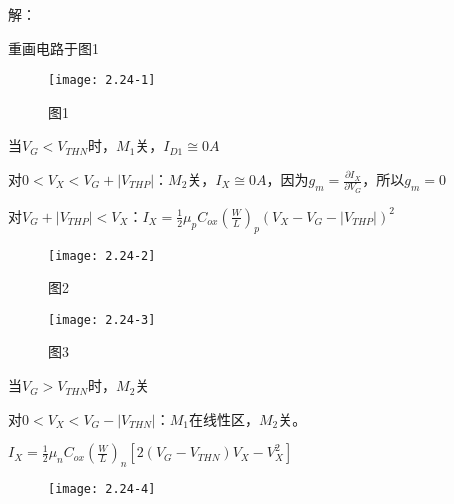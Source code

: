






解：

\scalebox{3}{（a）}

重画电路于图1

		\begin{figure}[H] %
	\begin{minipage}{\linewidth}
		\texttt{[image: 2.24-1]}
	\end{minipage}
	\caption*{图1} %
\end{figure}

\scalebox{2}{（1）}

当$V_G<V_{THN}$时，$M_1$关，$I_{D1}\cong 0A$

对$0<V_X<V_G+|V_{THP}|$：$M_2$关，$I_X\cong 0A$，因为$g_m=\frac{\partial I_X}{\partial V_G}$，所以$g_m=0$

对$V_G+|V_{THP}|<V_X$：$I_X=\frac{1}{2}\mu_pC_{ox}(\frac{W}{L})_p(V_{X}-V_G-|V_{THP}|)^2$

		\begin{figure}[H] %
	\begin{minipage}{\linewidth}
		\texttt{[image: 2.24-2]}
	\end{minipage}
	\caption*{图2} %
\end{figure}

		\begin{figure}[H] %
	\begin{minipage}{\linewidth}
		\texttt{[image: 2.24-3]}
	\end{minipage}
	\caption*{图3} %
\end{figure}



\scalebox{2}{（2）}

当$V_G>V_{THN}$时，$M_2$关

对$0<V_X<V_G-|V_{THN}|$：$M_1$在线性区，$M_2$关。

$I_X=\frac{1}{2}\mu_nC_{ox}(\frac{W}{L})_n[2(V_G-V_{THN})V_X-V^2_X]$

\begin{figure}[H] %
	\begin{minipage}{\linewidth}
		\texttt{[image: 2.24-4]}
	\end{minipage}
\end{figure}

